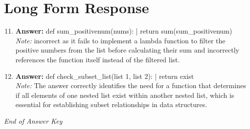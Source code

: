 \documentclass[12pt]{article}
\begin{document}
\section*{Long Form Response}
\begin{enumerate}[label=\arabic*.]
\setcounter{enumi}{10}
\item \textbf{Answer:} def sum\_positivenum(nums): | return sum(sum\_positivenum)
\\ \textit{Note:} incorrect as it fails to implement a lambda function to filter the positive numbers from the list before calculating their sum and incorrectly references the function itself instead of the filtered list.
\item \textbf{Answer:} def check\_subset\_list(list 1, list 2): | return exist
\\ \textit{Note:} The answer correctly identifies the need for a function that determines if all elements of one nested list exist within another nested list, which is essential for establishing subset relationships in data structures.
\end{enumerate}

\vfill
\noindent\textit{End of Answer Key}
\end{document}
